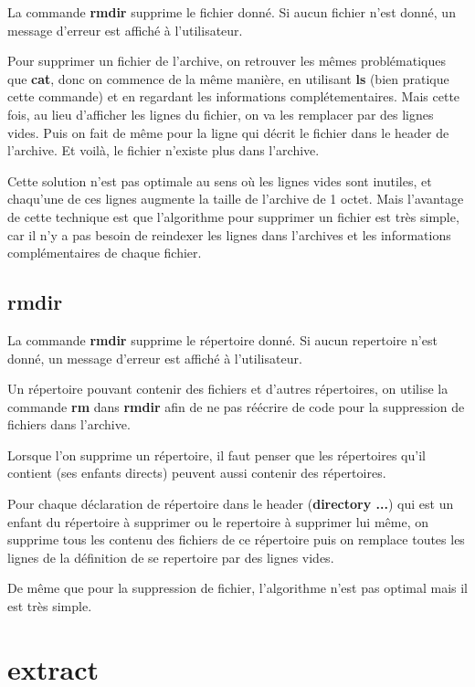 \documentclass[titlepage]{article}
\begin{document}
	La commande \textbf{rmdir} supprime le fichier donné. Si aucun fichier n'est donné, un message d'erreur est affiché à l'utilisateur. 

	Pour supprimer un fichier de l'archive, on retrouver les mêmes problématiques que \textbf{cat}, donc on commence de la même manière, en utilisant \textbf{ls} (bien pratique cette commande) et en regardant les informations complétementaires. Mais cette fois, au lieu d'afficher les lignes du fichier, on va les remplacer par des lignes vides. Puis on fait de même pour la ligne qui décrit le fichier dans le header de l'archive. Et voilà, le fichier n'existe plus dans l'archive.

	Cette solution n'est pas optimale au sens où les lignes vides sont inutiles, et chaqu'une de ces lignes augmente la taille de l'archive de 1 octet. Mais l'avantage de cette technique est que l'algorithme pour supprimer un fichier est très simple, car il n'y a pas besoin de reindexer les lignes dans l'archives et les informations complémentaires de chaque fichier.

	\subsection{rmdir}

	La commande \textbf{rmdir} supprime le répertoire donné. Si aucun repertoire n'est donné, un message d'erreur est affiché à l'utilisateur.

	Un répertoire pouvant contenir des fichiers et d'autres répertoires, on utilise la commande \textbf{rm} dans \textbf{rmdir} afin de ne pas réécrire de code pour la suppression de fichiers dans l'archive.

	Lorsque l'on supprime un répertoire, il faut penser que les répertoires qu'il contient (ses enfants directs) peuvent aussi contenir des répertoires. 

	Pour chaque déclaration de répertoire dans le header (\textbf{directory ...}) qui est un enfant du répertoire à supprimer ou le repertoire à supprimer lui même, on supprime tous les contenu des fichiers de ce répertoire puis on remplace toutes les lignes de la définition de se repertoire par des lignes vides.

	De même que pour la suppression de fichier, l'algorithme n'est pas optimal mais il est très simple.  

	\section{extract}
\end{document}

